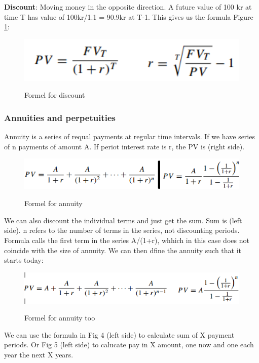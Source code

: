 \textbf{Discount}: Moving money in the opposite direction. A future value of 100 kr at time T has value of 100kr/1.1 = 90.9kr at T-1. This gives us the formula Figure \ref{fig:formel1-3}: 

\begin{figure}[ht!]
\centering
\includegraphics[width=120mm]{figures/formel1-3.png}
\label{fig:formel1-3}
\caption{Formel for discount}
\end{figure}

\subsubsection{Annuities and perpetuities}
Annuity is a series of requal payments at regular time intervals. If we have series of n payments of amount A. If periot interest rate is r, the PV is (right side).

\begin{figure}[ht!]
\centering
\includegraphics[width=120mm]{figures/formel1-4.png}
\label{fig:formel1-4}
\caption{Formel for annuity}
\end{figure}

We can also discount the individual terms and just get the sum. Sum is (left side). n refers to the number of terms in the series, not discounting periods. Formula calls the first term in the series A/(1+r), whhich in this case does not coincide with the size of annuity. We can then dfine the annuity such that it starts today:

\begin{figure}[ht!]
\centering
\includegraphics[width=120mm]{figures/formel1-5.png}
\label{fig:formel1-5}
\caption{Formel for annuity too}
\end{figure}

We can use the formula in Fig 4 (left side) to calculate sum of X payment periods. Or Fig 5 (left side) to calucate pay in X amount, one now and one each year the next X years. 

